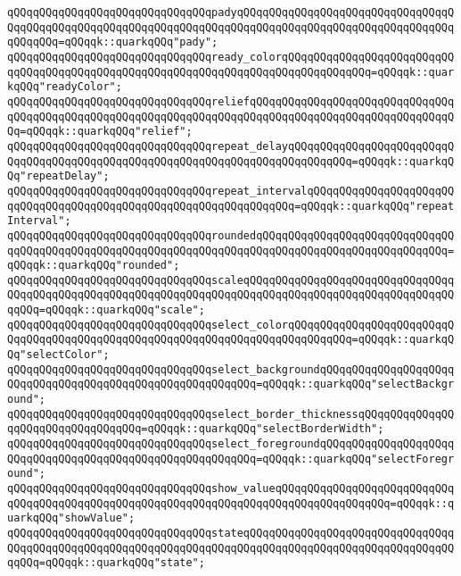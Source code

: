 \verb|qQQqqQQqqQQqqQQqqQQqqQQqqQQqqQQqpadyqQQqqQQqqQQqqQQqqQQqqQQqqQQqqQQqqQQqqQQqqQQqqQQqqQQqqQQqqQQqqQQqqQQqqQQqqQQqqQQqqQQqqQQqqQQqqQQqqQQqqQQqqQQqqQQq=qQQqqk::quarkqQQq"pady";|\newline
\verb|qQQqqQQqqQQqqQQqqQQqqQQqqQQqqQQqready_colorqQQqqQQqqQQqqQQqqQQqqQQqqQQqqQQqqQQqqQQqqQQqqQQqqQQqqQQqqQQqqQQqqQQqqQQqqQQqqQQqqQQq=qQQqqk::quarkqQQq"readyColor";|\newline
\verb|qQQqqQQqqQQqqQQqqQQqqQQqqQQqqQQqreliefqQQqqQQqqQQqqQQqqQQqqQQqqQQqqQQqqQQqqQQqqQQqqQQqqQQqqQQqqQQqqQQqqQQqqQQqqQQqqQQqqQQqqQQqqQQqqQQqqQQqqQQq=qQQqqk::quarkqQQq"relief";|\newline
\verb|qQQqqQQqqQQqqQQqqQQqqQQqqQQqqQQqrepeat_delayqQQqqQQqqQQqqQQqqQQqqQQqqQQqqQQqqQQqqQQqqQQqqQQqqQQqqQQqqQQqqQQqqQQqqQQqqQQqqQQq=qQQqqk::quarkqQQq"repeatDelay";|\newline
\verb|qQQqqQQqqQQqqQQqqQQqqQQqqQQqqQQqrepeat_intervalqQQqqQQqqQQqqQQqqQQqqQQqqQQqqQQqqQQqqQQqqQQqqQQqqQQqqQQqqQQqqQQqqQQq=qQQqqk::quarkqQQq"repeatInterval";|\newline
\verb|qQQqqQQqqQQqqQQqqQQqqQQqqQQqqQQqroundedqQQqqQQqqQQqqQQqqQQqqQQqqQQqqQQqqQQqqQQqqQQqqQQqqQQqqQQqqQQqqQQqqQQqqQQqqQQqqQQqqQQqqQQqqQQqqQQqqQQq=qQQqqk::quarkqQQq"rounded";|\newline
\verb|qQQqqQQqqQQqqQQqqQQqqQQqqQQqqQQqscaleqQQqqQQqqQQqqQQqqQQqqQQqqQQqqQQqqQQqqQQqqQQqqQQqqQQqqQQqqQQqqQQqqQQqqQQqqQQqqQQqqQQqqQQqqQQqqQQqqQQqqQQqqQQq=qQQqqk::quarkqQQq"scale";|\newline
\verb|qQQqqQQqqQQqqQQqqQQqqQQqqQQqqQQqselect_colorqQQqqQQqqQQqqQQqqQQqqQQqqQQqqQQqqQQqqQQqqQQqqQQqqQQqqQQqqQQqqQQqqQQqqQQqqQQqqQQq=qQQqqk::quarkqQQq"selectColor";|\newline
\verb|qQQqqQQqqQQqqQQqqQQqqQQqqQQqqQQqselect_backgroundqQQqqQQqqQQqqQQqqQQqqQQqqQQqqQQqqQQqqQQqqQQqqQQqqQQqqQQqqQQq=qQQqqk::quarkqQQq"selectBackground";|\newline
\verb|qQQqqQQqqQQqqQQqqQQqqQQqqQQqqQQqselect_border_thicknessqQQqqQQqqQQqqQQqqQQqqQQqqQQqqQQqqQQq=qQQqqk::quarkqQQq"selectBorderWidth";|\newline
\verb|qQQqqQQqqQQqqQQqqQQqqQQqqQQqqQQqselect_foregroundqQQqqQQqqQQqqQQqqQQqqQQqqQQqqQQqqQQqqQQqqQQqqQQqqQQqqQQqqQQq=qQQqqk::quarkqQQq"selectForeground";|\newline
\verb|qQQqqQQqqQQqqQQqqQQqqQQqqQQqqQQqshow_valueqQQqqQQqqQQqqQQqqQQqqQQqqQQqqQQqqQQqqQQqqQQqqQQqqQQqqQQqqQQqqQQqqQQqqQQqqQQqqQQqqQQqqQQq=qQQqqk::quarkqQQq"showValue";|\newline
\verb|qQQqqQQqqQQqqQQqqQQqqQQqqQQqqQQqstateqQQqqQQqqQQqqQQqqQQqqQQqqQQqqQQqqQQqqQQqqQQqqQQqqQQqqQQqqQQqqQQqqQQqqQQqqQQqqQQqqQQqqQQqqQQqqQQqqQQqqQQqqQQq=qQQqqk::quarkqQQq"state";|\newline
